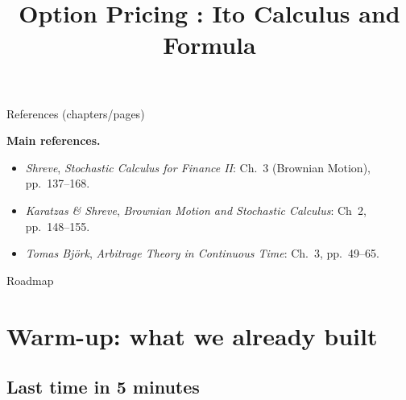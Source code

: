 \documentclass[10pt,aspectratio=169]{beamer}
\title{Option Pricing : Ito Calculus and Formula}
\author{}
\date{}
\begin{document}
\begin{frame}
  \titlepage
\end{frame}

\begin{frame}{References (chapters/pages)}

\footnotesize
\textbf{Main references.}
\begin{itemize}\setlength{\itemsep}{0.35em}
  \item \textit{Shreve}, \emph{Stochastic Calculus for Finance II}:
  Ch.~3 (Brownian Motion), pp.~137--168.
  \item \textit{Karatzas \& Shreve}, \emph{Brownian Motion
and Stochastic Calculus}:
  Ch~2, pp.~148--155.
  \item \textit{Tomas Bj\"ork}, \emph{Arbitrage Theory in Continuous Time}:
  Ch.~3, pp.~49--65.
\end{itemize}
\end{frame}
\begin{frame}{Roadmap}
  \tableofcontents[hideallsubsections]
\end{frame}

\section{Warm-up: what we already built}

\subsection{Last time in 5 minutes}
\end{document}
